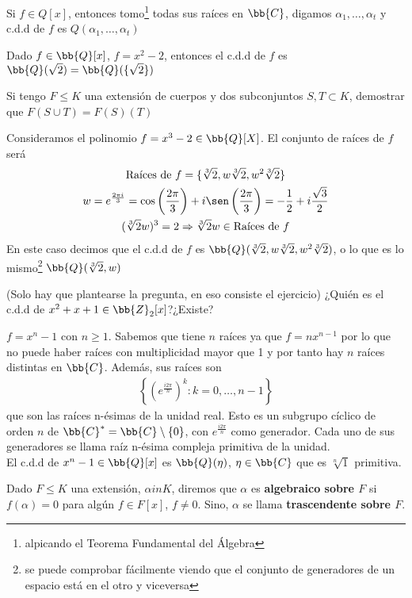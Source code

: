 \begin{observacion}
    Si $f\in Q[x]$, entonces tomo\footnote{alpicando el Teorema Fundamental del Álgebra} todas sus raíces en $\bb{C}$, digamos $\alpha_1, \dots, \alpha_t$ y c.d.d de $f$ es $Q(\alpha_1, \dots, \alpha_t)$
\end{observacion}

\begin{ejemplo}
    Dado $f\in \bb{Q}[x]$, $f=x^2-2$, entonces el c.d.d de $f$ es $\bb{Q}(\sqrt{2}) = \bb{Q}(\{\sqrt{2}\})$
\end{ejemplo}

\begin{ejercicio}
    Si tengo $F\leq K$ una extensión de cuerpos y dos subconjuntos $S,T\subset K$, demostrar que $F(S\cup T) = F(S)(T)$
\end{ejercicio}

\begin{ejemplo}
    Consideramos el polinomio $f=x^3-2 \in \bb{Q}[X]$. El conjunto de raíces de $f$ será
    \begin{gather*}
        \text{Raíces de }f = \{\sqrt[3]{2}, w\sqrt[3]{2}, w^2\sqrt[3]{2}\}\\
        w = e^{\frac{2\pi i}{3}} = \cos\left(\frac{2\pi}{3}\right) + i\sen\left(\frac{2\pi}{3}\right) = -\frac{1}{2} + i \frac{\sqrt{3}}{2}\\
        (\sqrt[3]{2} w)^3 = 2 \Rightarrow \sqrt[3]{2} w \in \text{Raíces de }f
    \end{gather*}
    En este caso decimos que el c.d.d de $f$ es $\bb{Q}(\sqrt[3]{2}, w\sqrt[3]{2}, w^2\sqrt[3]{2})$, o lo que es lo mismo\footnote{se puede comprobar fácilmente viendo que el conjunto de generadores de un espacio está en el otro y viceversa} $\bb{Q}(\sqrt[3]{2}, w)$
\end{ejemplo}

\begin{ejercicio}(Solo hay que plantearse la pregunta, en eso consiste el ejercicio)
    ¿Quién es el c.d.d de $x^2+ x +1 \in \bb{Z}_2[x]$?¿Existe?
\end{ejercicio}

\begin{ejemplo}
    $f=x^n-1$ con $n\geq1$. Sabemos que tiene $n$ raíces ya que $f=nx^{n-1}$ por lo que no puede haber raíces con multiplicidad mayor que 1 y por tanto hay $n$ raíces distintas en $\bb{C}$. Además, sus raíces son
    \begin{gather*}
        \left\{\left(e^{\frac{i2\pi}{n}}\right)^k : k=0,\dots,n-1\right\}
    \end{gather*}
    que son las raíces n-ésimas de la unidad real. Esto es un subgrupo cíclico de orden $n$ de $\bb{C}^* = \bb{C}\setminus \{0\}$, con $e^{\frac{i 2\pi}{n}}$ como generador. Cada uno de sus generadores se llama raíz n-ésima compleja primitiva de la unidad.\\

    El c.d.d de $x^n-1\in \bb{Q}[x]$ es $\bb{Q}(\eta)$, $\eta\in \bb{C}$ que es $\sqrt[n]{1}$ primitiva.
\end{ejemplo}

\begin{definicion}
    Dado $F\leq K$ una extensión, $\alpha in K$, diremos que $\alpha$ es \textbf{algebraico sobre $F$} si $f(\alpha)=0$ para algún $f\in F[x]$, $f\neq 0$. Sino, $\alpha$ se llama \textbf{trascendente sobre $F$}.
\end{definicion}


